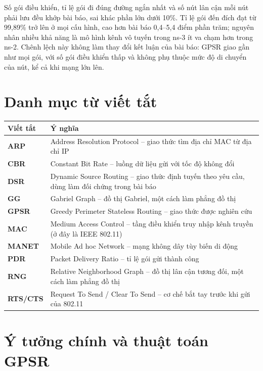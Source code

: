 \documentclass[a4paper,13pt]{extreport}
\begin{document}
Số gói điều khiển, tỉ lệ gói đi đúng đường ngắn nhất và số nút lân cận mỗi nút phải lưu đều khớp bài báo, sai khác phần lớn dưới 10\%. Tỉ lệ gói đến đích đạt từ 99,89\% trở lên ở mọi cấu hình, cao hơn bài báo 0,4--5,4 điểm phần trăm; nguyên nhân nhiều khả năng là mô hình kênh vô tuyến trong ns-3 ít va chạm hơn trong ns-2. Chênh lệch này không làm thay đổi kết luận của bài báo: GPSR giao gần như mọi gói, với số gói điều khiển thấp và không phụ thuộc mức độ di chuyển của nút, kể cả khi mạng lớn lên.

\tableofcontents
\listoffigures
\listoftables

\chapter*{Danh mục từ viết tắt}
\begin{center}
\begin{tabularx}{\textwidth}{>{\bfseries}l L}
\toprule
Viết tắt & Ý nghĩa\\
\midrule
ARP & Address Resolution Protocol -- giao thức tìm địa chỉ MAC từ địa chỉ IP\\
CBR & Constant Bit Rate -- luồng dữ liệu gửi với tốc độ không đổi\\
DSR & Dynamic Source Routing -- giao thức định tuyến theo yêu cầu, dùng làm đối chứng trong bài báo\\
GG & Gabriel Graph -- đồ thị Gabriel, một cách làm phẳng đồ thị\\
GPSR & Greedy Perimeter Stateless Routing -- giao thức được nghiên cứu\\
MAC & Medium Access Control -- tầng điều khiển truy nhập kênh truyền (ở đây là IEEE 802.11)\\
MANET & Mobile Ad hoc Network -- mạng không dây tùy biến di động\\
PDR & Packet Delivery Ratio -- tỉ lệ gói gửi thành công\\
RNG & Relative Neighborhood Graph -- đồ thị lân cận tương đối, một cách làm phẳng đồ thị\\
RTS/CTS & Request To Send / Clear To Send -- cơ chế bắt tay trước khi gửi của 802.11\\
\bottomrule
\end{tabularx}
\end{center}

\clearpage
{}

\chapter{Ý tưởng chính và thuật toán GPSR}
\end{document}
